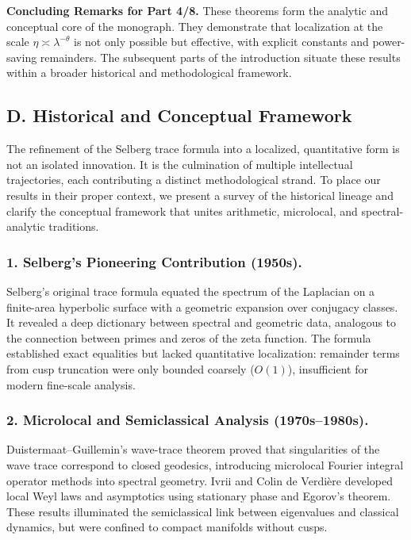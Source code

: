 \medskip

\noindent\textbf{Concluding Remarks for Part 4/8.}
These theorems form the analytic and conceptual core of the monograph.
They demonstrate that localization at the scale $\eta\asymp\lambda^{-\theta}$
is not only possible but effective, with explicit constants and power-saving remainders.
The subsequent parts of the introduction situate these results within a broader
historical and methodological framework.



\subsection*{D. Historical and Conceptual Framework}

The refinement of the Selberg trace formula into a localized, quantitative form
is not an isolated innovation. It is the culmination of multiple intellectual trajectories,
each contributing a distinct methodological strand. To place our results in their proper context,
we present a survey of the historical lineage and clarify the conceptual framework
that unites arithmetic, microlocal, and spectral-analytic traditions.

\subsubsection*{1. Selberg’s Pioneering Contribution (1950s).}
Selberg’s original trace formula \cite{Selberg1956} equated the spectrum of the Laplacian
on a finite-area hyperbolic surface with a geometric expansion over conjugacy classes.
It revealed a deep dictionary between spectral and geometric data, analogous
to the connection between primes and zeros of the zeta function.
The formula established exact equalities but lacked quantitative localization:
remainder terms from cusp truncation were only bounded coarsely ($O(1)$),
insufficient for modern fine-scale analysis.

\subsubsection*{2. Microlocal and Semiclassical Analysis (1970s–1980s).}
Duistermaat–Guillemin’s wave-trace theorem \cite{DG1975}
proved that singularities of the wave trace correspond to closed geodesics,
introducing microlocal Fourier integral operator methods into spectral geometry.
Ivrii \cite{Ivrii1980} and Colin de Verdière \cite{Colin1978} developed local Weyl laws
and asymptotics using stationary phase and Egorov’s theorem.
These results illuminated the semiclassical link between eigenvalues and classical dynamics,
but were confined to compact manifolds without cusps.

